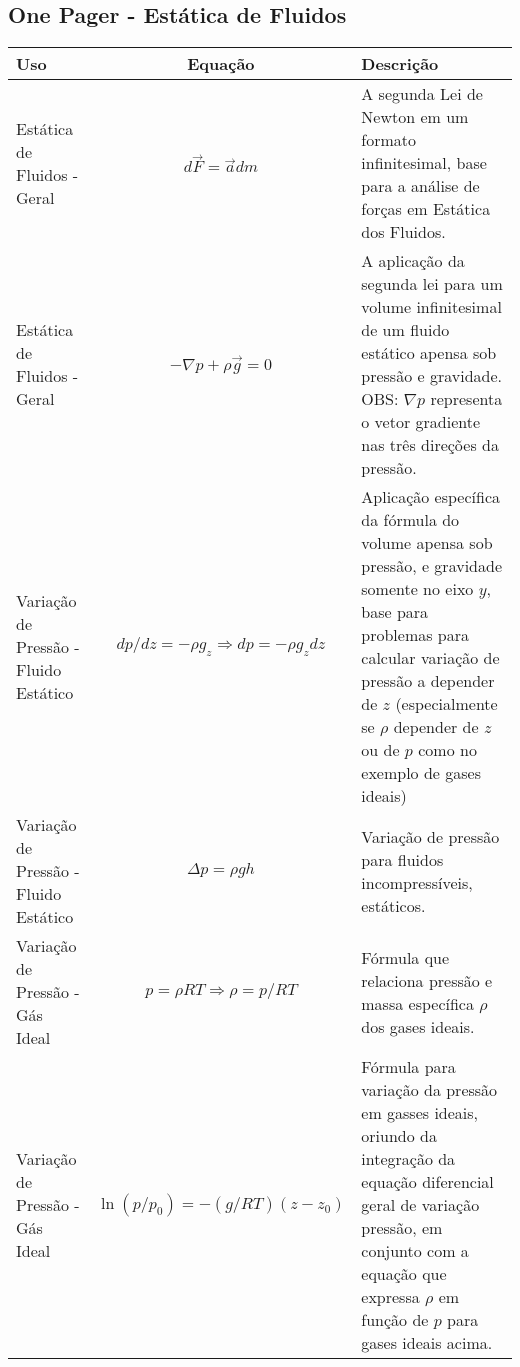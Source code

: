 \documentclass{article}
\begin{document}
        \newpage

        \subsection{One Pager - Estática de Fluidos}

        \begin{table}[h]
            \begin{tabularx}{\textwidth}{|l|c|X|}\hline
                \textbf{Uso} & \textbf{Equação} & \textbf{Descrição} \\ \hline 

                Estática de Fluidos - Geral & $d\vec{F} = \vec{a} dm$ & A segunda Lei de Newton em um formato infinitesimal, base para a análise de forças em Estática dos Fluidos. \\ \hline 
                Estática de Fluidos - Geral & $- \nabla p + \rho \vec g = 0$ & A aplicação da segunda lei para um volume infinitesimal de um fluido estático apensa sob pressão e gravidade. OBS: $\nabla p$ representa o vetor
                gradiente nas três direções da pressão. \\ \hline

                Variação de Pressão - Fluido Estático & $dp/dz = -\rho g_z \Rightarrow dp = -\rho g_z dz$ & Aplicação específica da fórmula do volume apensa sob pressão, e gravidade somente no eixo
                $y$, base para problemas para calcular variação de pressão a depender de $z$ (especialmente se $\rho$ depender de $z$ ou de $p$ como no exemplo de gases ideais) \\ \hline 

                Variação de Pressão - Fluido Estático & $\Delta p = \rho g h$ & Variação de pressão para fluidos incompressíveis, estáticos. \\ \hline

                Variação de Pressão - Gás Ideal & $p = \rho RT \Rightarrow \rho = p/RT$ & Fórmula que relaciona pressão e massa específica $\rho$ dos gases ideais. \\ \hline

                Variação de Pressão - Gás Ideal & $\ln{(p/p_0)} = -(g/RT)(z - z_0)$ & Fórmula para variação da pressão em gasses ideais, oriundo da integração da equação diferencial geral de variação
                pressão, em conjunto com a equação que expressa $\rho$ em função de $p$ para gases ideais acima. \\ \hline

            \end{tabularx}
        \end{table}
        \newpage
\end{document}
